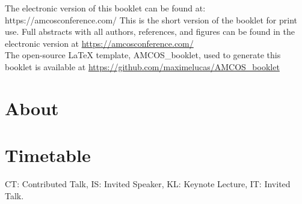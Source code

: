 \documentclass[openany, parskip=full, 12pt, a4]{scrbook}
\begin{document}
	
	
\mbox{}
\thispagestyle{empty}
\vfill
\begin{center}
	\ifOnline
	The electronic version of this booklet can be found at: \\
	https://amcosconference.com/
	\else
	This is the short version of the booklet for print use. Full abstracts with all authors, references, and figures can be found in the electronic version at \url{https://amcosconference.com/}
	\fi %
	\\[20pt] %
	The open-source \LaTeX{} template, AMCOS\_booklet, used to generate this booklet is available at \url{https://github.com/maximelucas/AMCOS\_booklet}
\end{center}

\newpage

\tableofcontents

\chapter{About}



\chapter{Timetable}

CT: Contributed Talk, IS: Invited Speaker, KL: Keynote Lecture, IT: Invited Talk.




\end{document}
